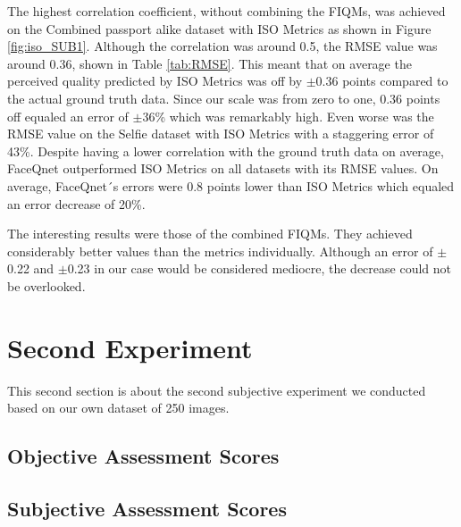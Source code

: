 \begin{table}[h]
\caption{The calculated RMSE values of the FIQMs on the datasets relative to the ground truth data. The RMSE value was not calculated for the Selfie dataset with the combined scores of the FIQMs. The `X' symbolises this.}
\label{tab:RMSE}
\end{table}
\noindent
The highest correlation coefficient, without combining the FIQMs, was achieved on the Combined passport alike dataset with ISO Metrics as shown in Figure \ref{fig:iso_SUB1}. Although the correlation was around 0.5, the RMSE value was around 0.36, shown in Table \ref{tab:RMSE}. This meant that on average the perceived quality predicted by ISO Metrics was off by $\pm$0.36 points compared to the actual ground truth data. Since our scale was from zero to one, 0.36 points off equaled an error of $\pm$36\% which was remarkably high. Even worse was the RMSE value on the Selfie dataset with ISO Metrics with a staggering error of 43\%. Despite having a lower correlation with the ground truth data on average, FaceQnet outperformed ISO Metrics on all datasets with its RMSE values. On average, FaceQnet´s errors were 0.8 points lower than ISO Metrics which equaled an error decrease of 20\%.  

The interesting results were those of the combined FIQMs. They achieved considerably better values than the metrics individually. Although an error of $\pm$0.22 and $\pm$0.23 in our case would be considered mediocre, the decrease could not be overlooked. 

\section{Second Experiment}
This second section is about the second subjective experiment we conducted based on our own dataset of 250 images. 
\subsection{Objective Assessment Scores}
\subsection{Subjective Assessment Scores}